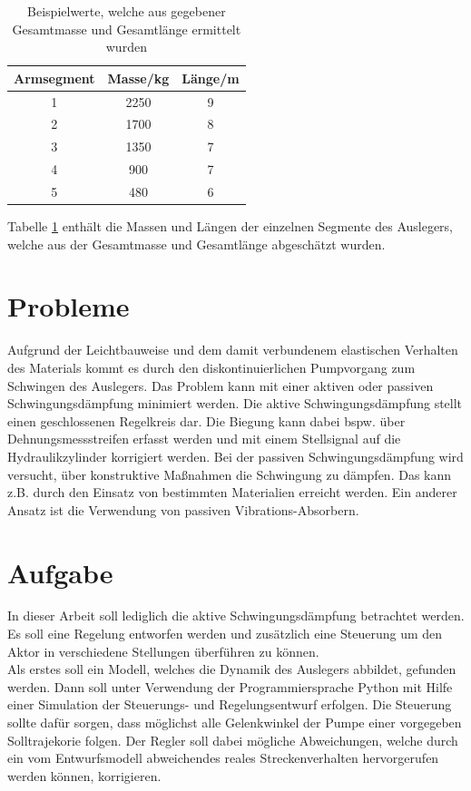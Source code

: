 \begin{table}[h!]
\centering
\begin{tabular}{c|c|c}
\rule[-1ex]{0pt}{2.5ex} Armsegment & Masse/kg & Länge/m \\ 
\hline \rule[-1ex]{0pt}{2.5ex} 1 & 2250 & 9 \\ 
\rule[-1ex]{0pt}{2.5ex} 2 & 1700 & 8 \\ 
\rule[-1ex]{0pt}{2.5ex} 3 & 1350 & 7 \\ 
\rule[-1ex]{0pt}{2.5ex} 4 & 900 & 7 \\ 
\rule[-1ex]{0pt}{2.5ex} 5 & 480 & 6 \\ 
\end{tabular} 
\caption{Beispielwerte, welche aus gegebener Gesamtmasse und Gesamtlänge ermittelt wurden}
\label{tab:WertePumpe}
\end{table}

Tabelle \ref{tab:WertePumpe} enthält die Massen und Längen der einzelnen Segmente des Auslegers, welche aus der Gesamtmasse und Gesamtlänge abgeschätzt wurden.

\section{Probleme}
Aufgrund der Leichtbauweise und dem damit verbundenem elastischen Verhalten des Materials kommt es durch den diskontinuierlichen Pumpvorgang zum Schwingen des Auslegers. Das Problem kann mit einer aktiven oder passiven Schwingungsdämpfung minimiert werden. Die aktive Schwingungsdämpfung stellt einen geschlossenen Regelkreis dar. Die Biegung kann dabei bspw. über Dehnungsmessstreifen erfasst werden und mit einem Stellsignal auf die Hydraulikzylinder korrigiert werden. Bei der passiven Schwingungsdämpfung wird versucht, über konstruktive Maßnahmen die Schwingung zu dämpfen. Das kann z.B. durch den Einsatz von bestimmten Materialien erreicht werden. Ein anderer Ansatz ist die Verwendung von passiven Vibrations-Absorbern. 

\section{Aufgabe}
In dieser Arbeit soll lediglich die aktive Schwingungsdämpfung betrachtet werden. Es soll eine Regelung entworfen werden und zusätzlich eine Steuerung um den Aktor in verschiedene Stellungen überführen zu können. \\
Als erstes soll ein Modell, welches die Dynamik des Auslegers abbildet, gefunden werden. Dann soll unter Verwendung der Programmiersprache Python mit Hilfe einer Simulation der Steuerungs- und Regelungsentwurf erfolgen. Die Steuerung sollte dafür sorgen, dass möglichst alle Gelenkwinkel der Pumpe einer vorgegeben Solltrajekorie folgen. Der Regler soll dabei mögliche Abweichungen, welche durch ein vom Entwurfsmodell abweichendes reales Streckenverhalten hervorgerufen werden können, korrigieren. 


